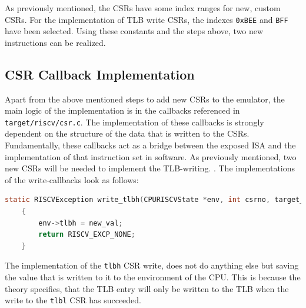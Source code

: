 As previously mentioned, the CSRs have some index ranges for new, custom CSRs. For the implementation
of TLB write CSRs, the indexes \texttt{0xBEE} and \texttt{BFF} have been selected.
Using these constants and the steps above, two new instructions can be realized.

\subsection{CSR Callback Implementation} Apart from the above mentioned steps to add new CSRs to the emulator, the
main logic of the implementation is in the callbacks referenced in \texttt{target/riscv/csr.c}.
The implementation of these callbacks is strongly dependent on the structure of the data that is written to
the CSRs. Fundamentally, these callbacks act as a bridge between the exposed ISA and the implementation of
that instruction set in software.
As previously mentioned, two new CSRs will be needed to implement the TLB-writing. .
The implementations
of the write-callbacks look as follows:



\begin{lstlisting}[language=c,float=h!,
    label={lst:tlbh}]
    static RISCVException write_tlbh(CPURISCVState *env, int csrno, target_ulong new_val)
    {
        env->tlbh = new_val;
        return RISCV_EXCP_NONE;
    }
\end{lstlisting}
The implementation of the \texttt{tlbh} CSR write, does not do anything else but saving the value
that is written to it to the environment of the CPU.
This is because the theory specifies, that the TLB entry will only
be written to the TLB when the write to the \texttt{tlbl} CSR has succeeded.

